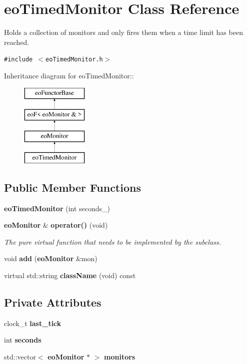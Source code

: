 \section{eo\-Timed\-Monitor Class Reference}
\label{classeo_timed_monitor}
Holds a collection of monitors and only fires them when a time limit has been reached.  


{\tt \#include $<$eo\-Timed\-Monitor.h$>$}

Inheritance diagram for eo\-Timed\-Monitor::\begin{figure}[H]
\begin{center}
\leavevmode
\includegraphics[height=4cm]{classeo_timed_monitor}
\end{center}
\end{figure}
\subsection*{Public Member Functions}
\begin{CompactItemize}
\item 
{\bf eo\-Timed\-Monitor} (int seconds\_\-)\label{classeo_timed_monitor_a0}

\item 
{\bf eo\-Monitor} \& {\bf operator()} (void)\label{classeo_timed_monitor_a1}

\begin{CompactList}\small\item\em The pure virtual function that needs to be implemented by the subclass. \item\end{CompactList}\item 
void {\bf add} ({\bf eo\-Monitor} \&mon)\label{classeo_timed_monitor_a2}

\item 
virtual std::string {\bf class\-Name} (void) const \label{classeo_timed_monitor_a3}

\end{CompactItemize}
\subsection*{Private Attributes}
\begin{CompactItemize}
\item 
clock\_\-t {\bf last\_\-tick}\label{classeo_timed_monitor_r0}

\item 
int {\bf seconds}\label{classeo_timed_monitor_r1}

\item 
std::vector$<$ {\bf eo\-Monitor} $\ast$ $>$ {\bf monitors}\label{classeo_timed_monitor_r2}

\end{CompactItemize}


